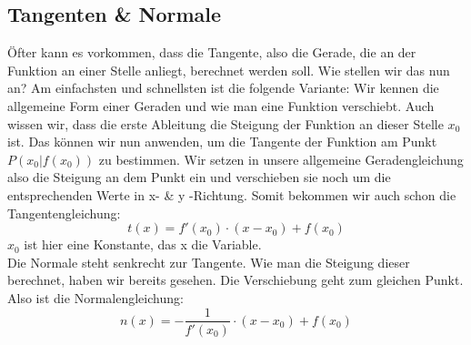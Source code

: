 \subsection{Tangenten \& Normale}
	Öfter kann es vorkommen, dass die Tangente, also die Gerade, die an der
	Funktion an einer Stelle anliegt, berechnet werden soll. Wie stellen wir das
	nun an? Am einfachsten und schnellsten ist die folgende Variante: Wir kennen
	die allgemeine Form einer Geraden und wie man eine Funktion verschiebt. Auch
	wissen wir, dass die erste Ableitung die Steigung der Funktion an dieser Stelle
	\(x_0\) ist. Das können wir nun anwenden, um die Tangente der Funktion am Punkt
	\(P(x_0|f(x_0))\) zu bestimmen. Wir setzen in unsere allgemeine
	Geradengleichung also die Steigung an dem Punkt ein und verschieben sie noch um
	die entsprechenden Werte in x- \& y -Richtung. Somit bekommen wir auch schon
	die Tangentengleichung:
	\[t(x)=f'(x_0)\cdot (x-x_0)+f(x_0)\]
	\(x_0\) ist hier eine Konstante, das x die Variable.\\
	Die Normale steht senkrecht zur Tangente. Wie man die Steigung dieser
	berechnet, haben wir bereits gesehen. Die Verschiebung geht zum gleichen Punkt.
	Also ist die Normalengleichung:
	\[n(x)=-\frac{1}{f'(x_0)}\cdot (x-x_0)+f(x_0)\]
